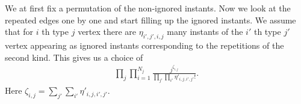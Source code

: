 \documentclass[12pt]{article}
\numberwithin{equation}{section}
\numberwithin{equation}{section}
\theoremstyle{definition}
\renewcommand{\1}{\bf 1}
\begin{document}
We at first fix a permutation of the non-ignored instants. Now we look at the repeated edges one by one and start filling up the ignored instants. 
We assume that for $i$ th type $j$ vertex there are $\eta_{i',j', i,j}$ many instants of the $i'$ th type $j'$ vertex appearing as ignored instants corresponding to the repetitions of the second kind. This gives us a choice of 
\begin{equation}
\begin{split}
\prod_{j}\prod_{i=1}^{N_{j}} \frac{j^{\zeta_{i,j}}}{\prod_{j'}\prod_{i'} \eta'_{i,j,i',j'}!}.
\end{split}
\end{equation}
Here $\zeta_{i,j}=\sum_{j'}\sum_{i'} \eta'_{i,j,i',j'}$.


\end{document}

